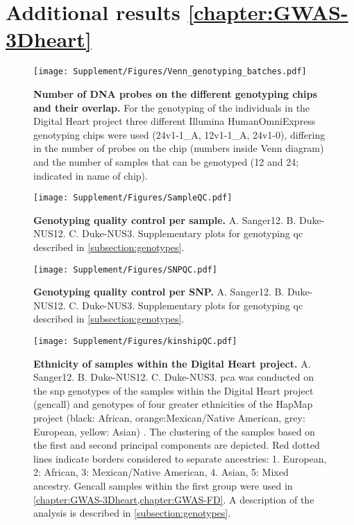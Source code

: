 \section{Additional results \cref{chapter:GWAS-3Dheart}}
\begin{figure}[hbtp]
	\centering
	\texttt{[image: Supplement/Figures/Venn\_genotyping\_batches.pdf]}
	\caption[\textbf{Number of DNA probes on the different genotyping chips and their overlap.}]{\textbf{Number of DNA probes on the different genotyping chips and their overlap.} For the genotyping of the individuals in the Digital Heart project three different Illumina HumanOmniExpress genotyping chips were used (24v1-1\_A, 12v1-1\_A, 24v1-0), differing in the number of probes on the chip (numbers inside Venn diagram) and the number of samples that can be genotyped (12 and 24; indicated in name of chip).}
 	\label{fig:probeoverlap}
\end{figure}

\begin{figure}[hbtp]
	\centering
	\texttt{[image: Supplement/Figures/SampleQC.pdf]}
	\caption[\textbf{Genotyping quality control per sample.}]{\textbf{Genotyping quality control per sample.} A. Sanger12. B. Duke-NUS12. C. Duke-NUS3. Supplementary plots for genotyping \gls{qc} described in \cref{subsection:genotypes}.}
 	\label{fig:sampleQC}
\end{figure}

\begin{figure}[hbtp]
	\centering
	\texttt{[image: Supplement/Figures/SNPQC.pdf]}
	\caption[\textbf{Genotyping quality control per SNP.}]{\textbf{Genotyping quality control per SNP.} A. Sanger12. B. Duke-NUS12. C. Duke-NUS3. Supplementary plots for genotyping \gls{qc} described in \cref{subsection:genotypes}.}
 	\label{fig:SNPQC}
 	\end{figure}

\begin{figure}[hbtp]
	\centering
	\texttt{[image: Supplement/Figures/kinshipQC.pdf]}
	\caption[\textbf{Ethnicity of samples within the Digitial Heart project. }]{\textbf{Ethnicity of samples within the Digital Heart project.} A. Sanger12. B. Duke-NUS12. C. Duke-NUS3. \gls{pca} was conducted on the \gls{snp} genotypes of the samples within the Digital Heart project (gencall) and genotypes of four greater ethnicities of the HapMap project (black: African, orange:Mexican/Native American, grey: European, yellow: Asian) \citep{HapMap2005,HapMap2007}. The clustering of the samples based on the first and second principal components are depicted. Red dotted lines indicate borders considered to separate ancestries: 1. European, 2: African, 3: Mexican/Native American, 4. Asian, 5: Mixed ancestry. Gencall samples within the first group were used in \cref{chapter:GWAS-3Dheart,chapter:GWAS-FD}.  A description of the analysis is described in \cref{subsection:genotypes}.}
 	\label{fig:kinshipQC}
\end{figure}

